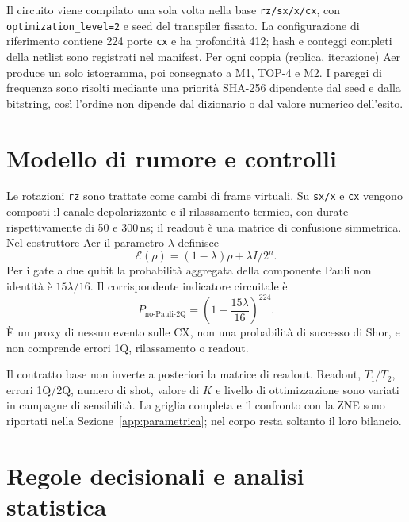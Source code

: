 \begin{onehalfspace}
Il circuito viene compilato una sola volta nella base
\texttt{rz/sx/x/cx}, con \texttt{optimization\_level=2} e seed del
transpiler fissato. La configurazione di riferimento contiene 224 porte
\texttt{cx} e ha profondità 412; hash e conteggi completi della netlist sono
registrati nel manifest. Per ogni coppia (replica, iterazione) Aer produce
un solo istogramma, poi consegnato a M1, TOP-4 e M2. I pareggi di frequenza
sono risolti mediante una priorità SHA-256 dipendente dal seed e dalla
bitstring, così l'ordine non dipende dal dizionario o dal valore numerico
dell'esito.

\section{Modello di rumore e controlli}
\label{sec:mitigazione_scelte}
\label{subsec:transpilazione}
\label{subsec:noise_uniforme}

Le rotazioni \texttt{rz} sono trattate come cambi di frame virtuali. Su
\texttt{sx/x} e \texttt{cx} vengono composti il canale depolarizzante e il
rilassamento termico, con durate rispettivamente di 50 e 300\,ns; il
readout è una matrice di confusione simmetrica. Nel costruttore Aer il
parametro $\lambda$ definisce
\[
  \mathcal{E}(\rho)=(1-\lambda)\rho+\lambda I/2^n.
\]
Per i gate a due qubit la probabilità aggregata della componente Pauli non
identità è $15\lambda/16$. Il corrispondente indicatore circuitale è
\begin{equation}
  P_{\mathrm{no\text{-}Pauli\text{-}2Q}}
  =\left(1-\frac{15\lambda}{16}\right)^{224}.
  \label{eq:proxy_no_pauli_2q}
\end{equation}
È un proxy di nessun evento sulle CX, non una probabilità di successo di
Shor, e non comprende errori 1Q, rilassamento o readout.

\label{subsec:readout_mitigation}
Il contratto base non inverte a posteriori la matrice di readout. Readout,
$T_1/T_2$, errori 1Q/2Q, numero di shot, valore di $K$ e livello di
ottimizzazione sono variati in campagne di sensibilità. La griglia completa
e il confronto con la \ac{ZNE} sono riportati nella
Sezione~\ref{app:parametrica}; nel corpo resta soltanto il loro bilancio.
\label{subsec:zne}
\label{subsec:sensitivity}

\section{Regole decisionali e analisi statistica}
\label{subsec:scelta_ml}
\label{sec:metodo1}
\label{sec:metodo2}


\end{onehalfspace}
